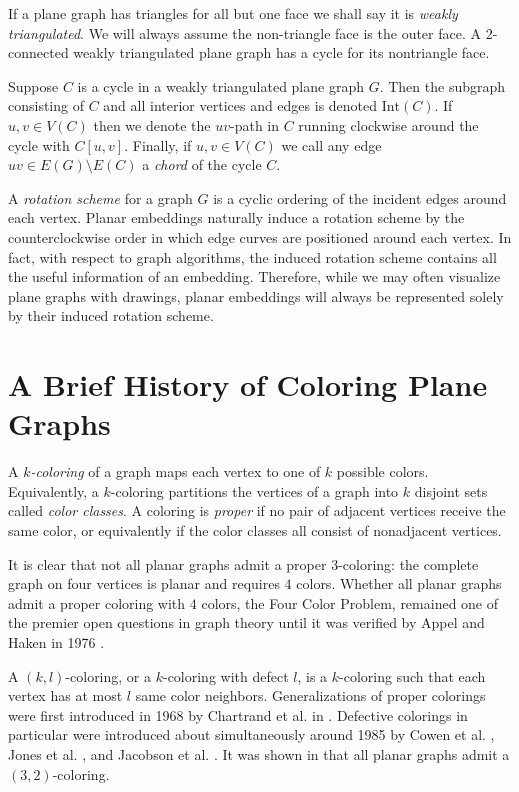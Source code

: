 \documentclass[letterpaper, 12pt]{article}
\theoremstyle{definition}
\theoremstyle{definition}
\theoremstyle{thm}
\theoremstyle{definition}
\begin{document}
If a plane graph has triangles for all but one face we shall say it is
\textit{weakly triangulated}. We will always assume the non-triangle face is the
outer face. A $2$-connected weakly triangulated plane graph has a cycle for its
nontriangle face.

Suppose $C$ is a cycle in a weakly
triangulated plane graph $G$. Then the subgraph consisting of $C$ and all interior
vertices and edges is denoted $\text{Int}(C)$. If $u,v \in V(C)$ then we denote
the $uv$-path in $C$ running clockwise around the cycle with $C[u,v]$. Finally,
if $u,v\in V(C)$ we call any edge $uv \in E(G)\setminus E(C)$ a \textit{chord} of
the cycle $C$.

A \textit{rotation scheme} for a graph $G$ is a cyclic ordering of the incident
edges around each vertex. Planar embeddings naturally induce a rotation
scheme by the counterclockwise order in which edge curves are positioned around
each vertex. In fact, with respect to graph algorithms, the induced rotation
scheme contains all the useful information of an embedding. Therefore, while we
may often visualize plane graphs with drawings, planar embeddings will always be
represented solely by their induced rotation scheme.

\section{A Brief History of Coloring Plane Graphs}

A $k$\textit{-coloring} of a graph maps each vertex to one of $k$ possible
colors. Equivalently, a $k$-coloring partitions the vertices of a graph into $k$
disjoint sets called \textit{color classes}. 
A coloring is \textit{proper} if no pair of adjacent vertices receive the same
color, or equivalently if the color classes all consist of nonadjacent vertices.

It is clear that not all planar graphs admit a proper $3$-coloring: the
complete graph on four vertices is planar and requires $4$ colors. Whether all
planar graphs admit a proper coloring with $4$ colors, the Four Color Problem,
remained one of the premier open questions in graph theory until it was verified
by Appel and Haken in 1976 \cite{appel1, appel2}.

A $(k,l)$-coloring, or a $k$-coloring with defect $l$, is a
$k$-coloring such that each vertex has at most $l$ same color neighbors.
Generalizations of proper colorings were first introduced in 1968 by Chartrand et al. in
\cite{chartrand}. Defective colorings in particular were introduced about
simultaneously around 1985 by Cowen et al. \cite{cowen}, Jones et al. \cite{jones}, and
Jacobson et al. \cite{jacobson}. It was shown in \cite{cowen} that all
planar graphs admit a $(3,2)$-coloring.
\end{document}
